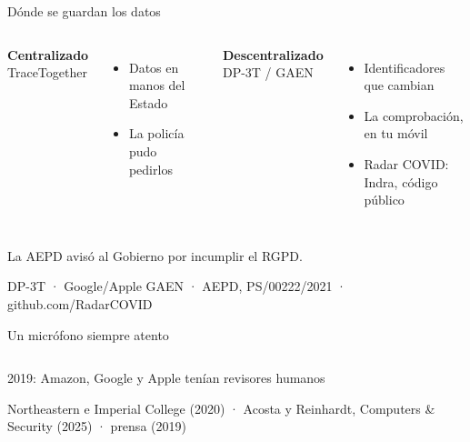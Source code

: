 \documentclass[aspectratio=169,12pt]{beamer}
\def\navprev{}
\def\navnext{}
\newcommand{\nav}[2]{\gdef\navprev{#1}\gdef\navnext{#2}}
\newcommand{\fuente}[1]{\vfill{\small\color{gris}#1\par}}
\begin{document}
\nav{Singapur}{Micrófono atento}
\begin{frame}{Dónde se guardan los datos}
  \vspace{-0.2cm}
  \begin{columns}[T]
      \begin{center}{\large\bfseries\color{terra}Centralizado}\\[-0.1cm]{\normalsize TraceTogether}\end{center}
      \begin{itemize}
        \item Datos en manos del Estado
        \item La policía pudo pedirlos
      \end{itemize}
      \begin{center}{\large\bfseries\color{azul}Descentralizado}\\[-0.1cm]{\normalsize DP-3T / GAEN}\end{center}
      \begin{itemize}
        \item Identificadores que cambian
        \item La comprobación, en tu móvil
        \item Radar COVID: Indra, código público
      \end{itemize}
  \end{columns}
  {\normalsize\alert{La AEPD avisó al Gobierno por incumplir el RGPD.}}
  \fuente{DP-3T · Google/Apple GAEN · AEPD, PS/00222/2021 · github.com/RadarCOVID}
\end{frame}

\nav{Dónde van los datos}{Amazon}
\begin{frame}{Un micrófono siempre atento}
  \begin{columns}[T]
  \end{columns}
  \vspace{0.2cm}
  \begin{center}
    {\large 2019: Amazon, Google y Apple tenían \alert{revisores humanos}}
  \end{center}
  \fuente{Northeastern e Imperial College (2020) · Acosta y Reinhardt, Computers \& Security (2025) · prensa (2019)}
\end{frame}
\end{document}
